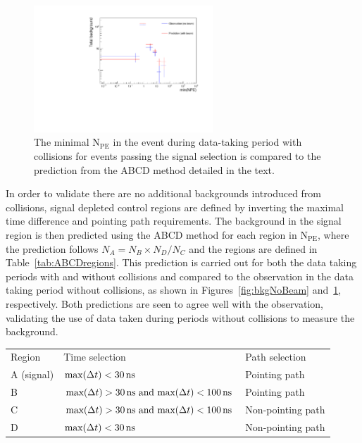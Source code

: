 \documentclass[12pt]{article}
\newcommand{\unit}[1]{\ensuremath{\text{\,#1}}\xspace}
\newcommand{\npe} {\mbox{\ensuremath{\textrm{N}_\textrm{PE}}}\xspace}
\begin{document}
\begin{figure}[ht!]
    \centering
    \includegraphics[width=0.6\textwidth]{figures/backgroundYieldsWithBeam_15ns_07}
    \caption{\label{fig:bkgWithBeam} The minimal \npe in the event during data-taking period with 
    collisions for events passing the signal selection is
    compared to the prediction from the ABCD method detailed in the text.}
\end{figure}

In order to validate there are no additional backgrounds introduced from collisions, signal depleted
control regions are defined by inverting the maximal time difference and pointing path requirements.
The background in the signal region is then predicted using the ABCD method for each region
in \npe, where the prediction follows $N_A = N_B\times N_D/N_C$ and the regions are defined in Table~\ref{tab:ABCDregions}. 
This prediction is carried out for both the data taking periods with and without collisions and compared
to the observation in the data taking period without collisions, as shown in Figures~\ref{fig:bkgNoBeam} 
and~\ref{fig:bkgWithBeam}, respectively. Both predictions are seen to agree well with the observation, 
validating the use of data taken during periods without collisions to measure the background.

\begin{table}
    \centering
    \scriptsize
    \begin{tabular}{lll}
	Region& Time selection & Path selection\\
	A (signal) & $\text{max}(\Delta t) < 30 \unit{ns}$ & Pointing path\\
	B & $\text{max}(\Delta t) > 30 \unit{ns} \text{ and } \text{max}(\Delta t) < 100 \unit{ns}$ & Pointing path\\
	C & $\text{max}(\Delta t) > 30 \unit{ns} \text{ and } \text{max}(\Delta t) < 100 \unit{ns}$ & Non-pointing path\\
	D &$\text{max}(\Delta t) < 30\unit{ns}$ & Non-pointing path\\
    \end{tabular}
\end{table}
\end{document}
